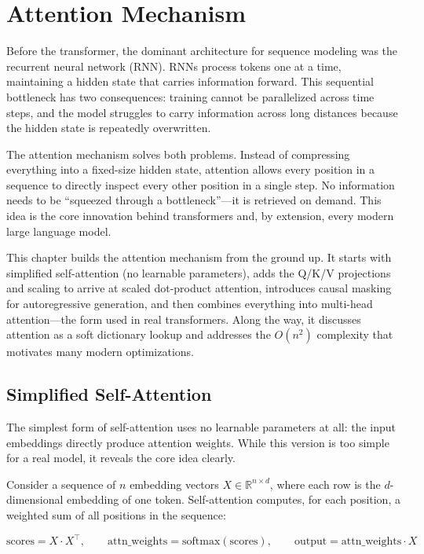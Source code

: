 \chapter{Attention Mechanism}

Before the transformer, the dominant architecture for sequence modeling was the
recurrent neural network (RNN). RNNs process tokens one at a time, maintaining a
hidden state that carries information forward. This sequential bottleneck has two
consequences: training cannot be parallelized across time steps, and the model
struggles to carry information across long distances because the hidden state is
repeatedly overwritten.

The attention mechanism solves both problems. Instead of compressing everything
into a fixed-size hidden state, attention allows every position in a sequence to
directly inspect every other position in a single step. No information needs to
be ``squeezed through a bottleneck''---it is retrieved on demand. This idea is
the core innovation behind transformers and, by extension, every modern large
language model.

This chapter builds the attention mechanism from the ground up. It starts with
simplified self-attention (no learnable parameters), adds the Q/K/V projections
and scaling to arrive at scaled dot-product attention, introduces causal masking
for autoregressive generation, and then combines everything into multi-head
attention---the form used in real transformers. Along the way, it discusses
attention as a soft dictionary lookup and addresses the $O(n^2)$ complexity that
motivates many modern optimizations.

\section{Simplified Self-Attention}

The simplest form of self-attention uses no learnable parameters at all: the
input embeddings directly produce attention weights. While this version is too
simple for a real model, it reveals the core idea clearly.

Consider a sequence of $n$ embedding vectors $X \in \mathbb{R}^{n \times d}$,
where each row is the $d$-dimensional embedding of one token. Self-attention
computes, for each position, a weighted sum of all positions in the sequence:

\[
  \text{scores} = X \cdot X^\top, \qquad
  \text{attn\_weights} = \text{softmax}(\text{scores}), \qquad
  \text{output} = \text{attn\_weights} \cdot X
\]

